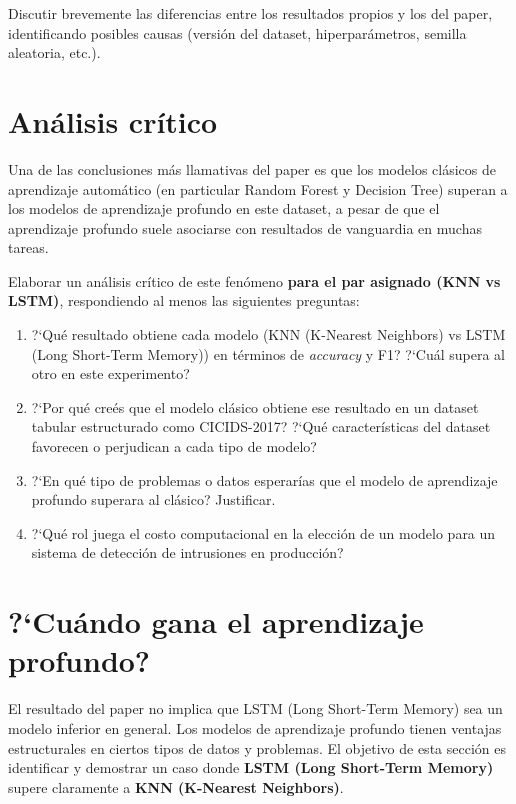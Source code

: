 \documentclass[11pt,a4paper]{article}
\begin{document}
Discutir brevemente las diferencias entre los resultados propios y los del paper, identificando posibles causas (versi\'on del dataset, hiperpar\'ametros, semilla aleatoria, etc.).

\section{An\'alisis cr\'itico}
Una de las conclusiones m\'as llamativas del paper es que los modelos cl\'asicos de aprendizaje autom\'atico (en particular Random Forest y Decision Tree) superan a los modelos de aprendizaje profundo en este dataset, a pesar de que el aprendizaje profundo suele asociarse con resultados de vanguardia en muchas tareas.

Elaborar un an\'alisis cr\'itico de este fen\'omeno \textbf{para el par asignado (KNN vs LSTM)}, respondiendo al menos las siguientes preguntas:
\begin{enumerate}[leftmargin=2em,itemsep=2pt]
    \item ?`Qu\'e resultado obtiene cada modelo (KNN (K-Nearest Neighbors) vs LSTM (Long Short-Term Memory)) en t\'erminos de \textit{accuracy} y F1? ?`Cu\'al supera al otro en este experimento?
    \item ?`Por qu\'e cre\'es que el modelo cl\'asico obtiene ese resultado en un dataset tabular estructurado como CICIDS-2017? ?`Qu\'e caracter\'isticas del dataset favorecen o perjudican a cada tipo de modelo?
    \item ?`En qu\'e tipo de problemas o datos esperar\'ias que el modelo de aprendizaje profundo superara al cl\'asico? Justificar.
    \item ?`Qu\'e rol juega el costo computacional en la elecci\'on de un modelo para un sistema de detecci\'on de intrusiones en producci\'on?
\end{enumerate}

\section{?`Cu\'ando gana el aprendizaje profundo?}
El resultado del paper no implica que LSTM (Long Short-Term Memory) sea un modelo inferior en general. Los modelos de aprendizaje profundo tienen ventajas estructurales en ciertos tipos de datos y problemas. El objetivo de esta secci\'on es identificar y demostrar un caso donde \textbf{LSTM (Long Short-Term Memory)} supere claramente a \textbf{KNN (K-Nearest Neighbors)}.
\end{document}
